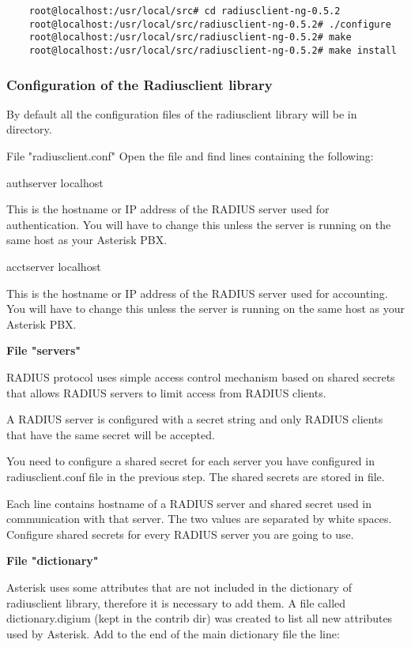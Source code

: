 \begin{verbatim}
	root@localhost:/usr/local/src# cd radiusclient-ng-0.5.2
	root@localhost:/usr/local/src/radiusclient-ng-0.5.2# ./configure
	root@localhost:/usr/local/src/radiusclient-ng-0.5.2# make
	root@localhost:/usr/local/src/radiusclient-ng-0.5.2# make install
\end{verbatim}

\subsubsection{Configuration of the Radiusclient library}
	
	By default all the configuration files of the radiusclient library will
	be in  directory.
		
	File "radiusclient.conf"
		Open the file and find lines containing the following:

			authserver      localhost
	
	This is the hostname or IP address of the RADIUS server used for 
	authentication. You will have to change this unless the server is 
	running on the same host as your Asterisk PBX.

			acctserver      localhost

	This is the hostname or IP address of the RADIUS server used for 
	accounting. You will have to change this unless the server is running
	on the same host as your Asterisk PBX.

	\textbf{File "servers"} 
		
	RADIUS protocol uses simple access control mechanism based on shared
	secrets that allows RADIUS servers to limit access from RADIUS clients.
		
	A RADIUS server is configured with a secret string and only RADIUS 
	clients that have the same secret will be accepted.

	You need to configure a shared secret for each server you have 
	configured in radiusclient.conf file in the previous step. The shared 
	secrets are stored in  file.

	Each line contains hostname of a RADIUS server and shared secret 
	used in communication with that server. The two values are separated 
	by white spaces. Configure shared secrets for every RADIUS server you 
	are going to use.

	\textbf{File "dictionary"}
			
	Asterisk uses some attributes that are not included in the 
	dictionary of radiusclient library, therefore it is necessary to add 
	them. A file called dictionary.digium (kept in the contrib dir)
	was created to list all new attributes used by Asterisk. 
	Add to the end of the main dictionary file
	 the line:

